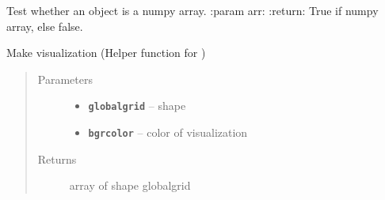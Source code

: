 \documentclass[letterpaper,10pt,english]{sphinxmanual}
\begin{document}

\begin{fulllineitems}
\label{RRtoolbox.lib.arrayops:RRtoolbox.lib.arrayops.basic.isnumpy}
Test whether an object is a numpy array.
:param arr:
:return: True if numpy array, else false.

\end{fulllineitems}


\begin{fulllineitems}
\label{RRtoolbox.lib.arrayops:RRtoolbox.lib.arrayops.basic.makeVis}
Make visualization (Helper function for {\hyperref[RRtoolbox.lib.arrayops:RRtoolbox.lib.arrayops.basic.padVH]{\emph{}}})
\begin{quote}\begin{description}
\item[{Parameters}] \leavevmode\begin{itemize}
\item {} 
\textbf{\texttt{globalgrid}} -- shape

\item {} 
\textbf{\texttt{bgrcolor}} -- color of visualization

\end{itemize}

\item[{Returns}] \leavevmode
array of shape globalgrid

\end{description}\end{quote}

\end{fulllineitems}

\end{document}
